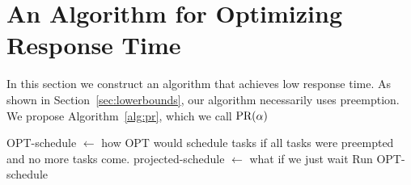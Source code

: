 \section{An Algorithm for Optimizing Response Time}
\label{sec:responsetime}

In this section we construct an algorithm that achieves low
response time. As shown in Section~\ref{sec:lowerbounds}, our
algorithm necessarily uses preemption.
We propose Algorithm~\ref{alg:pr}, which we call $\PR{\alpha}$
\begin{algorithm}
  \caption{$\PR{\alpha}$}
  \label{alg:pr}
  \begin{algorithmic}
      \State OPT-schedule $\gets$ how OPT would schedule tasks if
      all tasks were preempted and no more tasks come.
      \State projected-schedule $\gets$ what if we just wait
        \State Run OPT-schedule
      \EndIf
    \EndWhile
  \end{algorithmic}
\end{algorithm}



